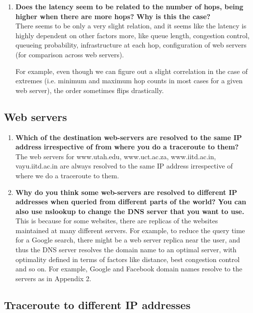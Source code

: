 \documentclass[a4paper]{article}
\newcommand{\nl}{\vspace{0.2cm}\\}
\begin{document}
\begin{enumerate}
    \item \textbf{Does the latency seem to be related to the number of hops, being higher when there are more hops? Why is this the case?}\nl
        There seems to be only a very slight relation, and it seems like the latency is highly dependent on other factors more, like queue length, congestion control, queueing probability, infrastructure at each hop, configuration of web servers (for comparison across web servers).

        For example, even though we can figure out a slight correlation in the case of extremes (i.e. minimum and maximum hop counts in most cases for a given web server), the order sometimes flips drastically.
\end{enumerate}

\subsection{Web servers}

\begin{enumerate}
    \item \textbf{Which of the destination web-servers are resolved to the same IP address irrespective of from where you do a traceroute to them?}\nl
        The web servers for www.utah.edu, www.uct.ac.za, www.iitd.ac.in, vayu.iitd.ac.in are always resolved to the same IP address irrespective of where we do a traceroute to them.
    \item \textbf{Why do you think some web-servers are resolved to different IP addresses when queried from different parts of the world? You can also use nslookup to change the DNS server that you want to use.}\nl
        This is because for some websites, there are replicas of the websites maintained at many different servers. For example, to reduce the query time for a Google search, there might be a web server replica near the user, and thus the DNS server resolves the domain name to an optimal server, with optimality defined in terms of factors like distance, best congestion control and so on. For example, Google and Facebook domain names resolve to the servers as in Appendix 2.
\end{enumerate}

\subsection{Traceroute to different IP addresses}
\end{document}
